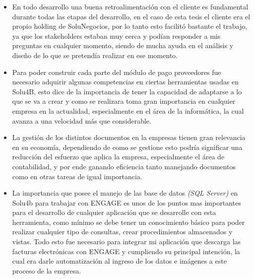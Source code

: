 	\begin{itemize}
		\item En todo desarrollo una buena retroalimentación con el cliente es fundamental durante todas las etapas del desarrollo, en el caso de esta tesis el cliente era el propio holding de SoluNegocios, por lo tanto esto facilitó bastante el trabajo, ya que los stakeholders estaban muy cerca y podían responder a mis preguntas en cualquier momento, siendo de mucha ayuda en el análisis y diseño de lo que se pretendía realizar en ese momento. 
		
		\item Para poder construir cada parte del módulo de pago proveedores  fue necesario adquirir algunas competencias en ciertas herramientas usadas en Solu4B, esto dice de la importancia de tener la capacidad de adaptarse a lo que se va a crear y como se realizara  toma gran importancia en cualquier empresa en la actualidad, especialmente en el área de la informática, la cual avanza a una velocidad más que considerable.
		
		\item La gestión de los distintos documentos en la empresas tienen gran relevancia en su economía, dependiendo de como se gestione esto podría significar una reducción del esfuerzo que aplica la empresa, especialmente el área de contabilidad, y por ende ganando eficiencia tanto manejando documentos como en otras tareas de igual importancia.
		
		\item La importancia que posee el manejo de las base de datos \textit{(SQL Server)} en Solu4b para trabajar con ENGAGE es unos de los puntos mas importantes para el desarrollo de cualquier aplicación que se desarrolle con esta herramienta, como mínimo se debe tener un conocimiento básico para poder realizar cualquier tipo de consultas, crear procedimientos almacenados y vistas. Todo esto fue necesario para integrar mi aplicación que descarga las facturas electrónicas con ENGAGE y cumpliendo su principal intención, la cual era darle automatización al ingreso de los datos e imágenes a este proceso de la empresa.
		
		
		
	\end{itemize}
	

